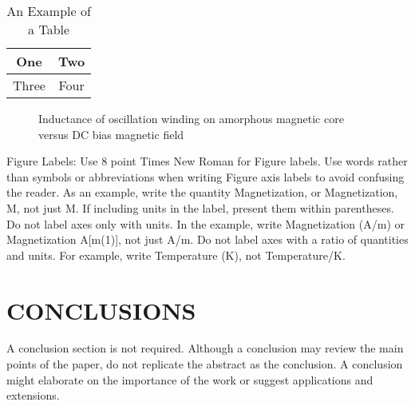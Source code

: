 \documentclass[letterpaper, 10 pt, conference]{ieeeconf}  %
\begin{document}
\begin{table}[h]
\caption{An Example of a Table}
\label{table_example}
\begin{center}
\begin{tabular}{|c||c|}
\hline
One & Two\\
\hline
Three & Four\\
\hline
\end{tabular}
\end{center}
\end{table}


   \begin{figure}[thpb]
      \centering
      \caption{Inductance of oscillation winding on amorphous
       magnetic core versus DC bias magnetic field}
      \label{figurelabel}
   \end{figure}
   

Figure Labels: Use 8 point Times New Roman for Figure labels. Use words rather than symbols or abbreviations when writing Figure axis labels to avoid confusing the reader. As an example, write the quantity Magnetization, or Magnetization, M, not just M. If including units in the label, present them within parentheses. Do not label axes only with units. In the example, write Magnetization (A/m) or Magnetization {A[m(1)]}, not just A/m. Do not label axes with a ratio of quantities and units. For example, write Temperature (K), not Temperature/K.

\section{CONCLUSIONS}

A conclusion section is not required. Although a conclusion may review the main points of the paper, do not replicate the abstract as the conclusion. A conclusion might elaborate on the importance of the work or suggest applications and extensions. 

\addtolength{\textheight}{-12cm}   %
\end{document}
